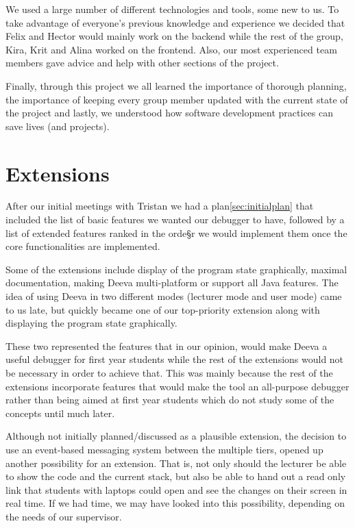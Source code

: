 \documentclass[11pt, a4paper]{article}
\begin{document}
We used a large number of different technologies and tools, some new to us.
To take advantage of everyone's previous knowledge and experience we decided that Felix and Hector would mainly work on the backend while the rest of the group, Kira, Krit and Alina worked on the frontend.
Also, our most experienced team members gave advice and help with other sections of the project.

Finally, through this project we all learned the importance of thorough planning, the importance of keeping every group member updated with the current state of the project and lastly, we understood how software development practices can save lives (and projects).

\section{Extensions}
After our initial meetings with Tristan we had a plan\ref{sec:initialplan} that included the list of basic features we wanted our debugger to have, followed by a list of extended features ranked in the orde§r we would implement them once the core functionalities are implemented.

Some of the extensions include display of the program state graphically, maximal documentation, making Deeva multi-platform or support all Java features.
The idea of using Deeva in two different modes (lecturer mode and user mode) came to us late, but quickly became one of our top-priority extension along with displaying the program state graphically.

These two represented the features that in our opinion, would make Deeva a useful debugger for first year students while the rest of the extensions would not be necessary in order to achieve that.
This was  mainly because the rest of the extensions incorporate features that would make the tool an all-purpose debugger rather than being aimed at first year students which do not study some of the concepts until much later.

Although not initially planned/discussed as a plausible extension, the decision to use an event-based messaging system between the multiple tiers, opened up another possibility for an extension.
That is, not only should the lecturer be able to show the code and the current stack, but also be able to hand out a read only link that students with laptops could open and see the changes on their screen in real time.
If we had time, we may have looked into this possibility, depending on the needs of our supervisor.
\end{document}
